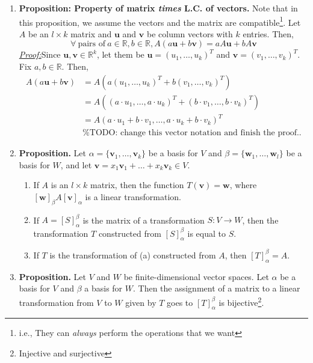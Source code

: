 \documentclass[oneside, 12pt]{book}
\newcommand{\settag}[1]{\renewcommand{\theenumi}{#1}}
\newcommand{\R}{\mathbb{R}}
\newcommand{\tbf}[1]{\textbf{#1}}
\newcommand{\tit}[1]{\textit{#1}}
\newcommand{\proof}{\tit{\underline{Proof:}}} %
\newcommand{\vv}{\mathbf{v}}
\newcommand{\vw}{\mathbf{w}}
\begin{document}
\begin{enumerate}
        \settag{2.2.18}
        \item \tbf{Proposition: Property of matrix \tit{times} L.C. of vectors.} Note that in this proposition, we assume the vectors and the matrix are compatible\footnote{i.e., They can \tit{always} perform the operations that we want}. Let $A$ be an $l\times k$ matrix and $\mathbf{u}$ and $\mathbf{v}$ be column vectors with $k$ entries. Then,
        \begin{equation*}
            \forall~ \text{pairs of}~a\in\R, b\in\R, A(a\mathbf{u} + b\mathbf{v}) = aA\mathbf{u} + bA\vv
        \end{equation*}
        \proof Since $\mathbf{u}, \mathbf{v}\in \R^k$, let them be $\mathbf{u} = (u_1,\ldots,u_k)^T$ and $\mathbf{v} = (v_1,\ldots,v_k)^T$.\newline 
        Fix $a,b\in \R$. Then,
        \begin{align*}
            A\left(a\mathbf{u} + b\mathbf{v}\right) &=  A\left(a\left(u_1,\ldots,u_k\right)^T + b\left(v_1,\ldots,v_k\right)^T\right) \\
            &=  A\left(\left(a\cdot u_1,\ldots,a\cdot u_k\right)^T + \left(b \cdot v_1,\ldots,b\cdot v_k\right)^T\right) \\
            &=  A\left(a\cdot u_1 + b \cdot v_1,\ldots,a\cdot u_k + b\cdot v_k \right)^T \\
            &\text{\%TODO: change this vector notation and finish the proof..}
        \end{align*}
        
        \settag{2.2.19}
        \item \tbf{Proposition.} Let $\alpha = \{\vv_1,\ldots,\vv_k\}$ be a basis for $V$ and $\beta= \{\vw_1,\ldots,\vw_l\}$ be a basis for $W$, and let $\mathbf{v}=x_1\vv_1+\ldots+x_k\vv_k\in V$.
        \begin{enumerate}
            \item If $A$ is an $l \times k$ matrix, then the function $T(\mathbf{v}) = \mathbf{w}$, where $\left[\vw\right]_\beta A\left[\vv\right]_\alpha$ is a linear transformation.
            \item If $A = [S]_\alpha^\beta$ is the matrix of a transformation $S:V\xrightarrow{} W$, then the transformation $T$ constructed from $[S]_\alpha^\beta$ is equal to $S$.
            \item If $T$ is the transformation of (a) constructed from $A$, then $[T]_\alpha^\beta = A$.
        \end{enumerate}
        
        \settag{2.2.20}
        \item \tbf{Proposition.} Let $V$ and $W$ be finite-dimensional vector spaces. Let $\alpha$ be a basis for $V$ and $\beta$ a basis for $W$. Then the assignment of a matrix to a linear transformation from $V$ to $W$ given by $T$ goes to $[T]_\alpha^\beta$ is bijective\footnote{Injective and surjective}.
    \end{enumerate}
    
\end{document}
